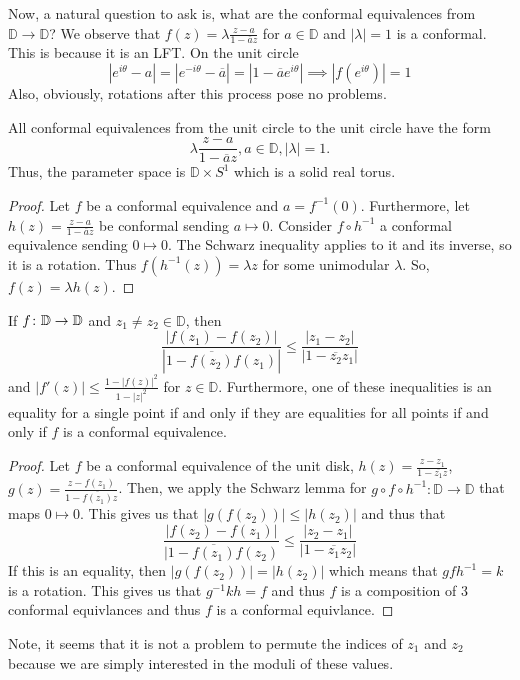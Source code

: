 \documentclass[11pt,leqno,oneside]{amsart}
\numberwithin{thm}{section}
\newcommand{\D}{\mathbb{D}}
\begin{document}
  Now, a natural question to ask is, what are the conformal
  equivalences from $\D \to \D$? We observe that $f(z) =
  \lambda\frac{z-a}{1-\overline{a}z}$ for $a \in \D$ and $|\lambda| =
  1$ is a conformal. This is because it is an LFT. On the unit
  circle \[
    |e^{i \theta} - a| = |e^{-i\theta} - \overline{a}| = |1 -
    \overline{a}e^{i\theta}| \implies |f(e^{i\theta})| = 1
  \]
  Also, obviously, rotations after this process pose no problems.
  \begin{thm}
    All conformal equivalences from the unit circle to the unit circle
    have the form \[
      \lambda \frac{z-a}{1-\overline{a}z}, a \in \D, |\lambda| = 1.
    \]
    Thus, the parameter space is $\D \times S^1$ which is a solid real torus.
  \end{thm}
  \begin{proof}
    Let $f$ be a conformal equivalence and $a =
    f^{-1}(0)$. Furthermore, let $h(z) = \frac{z-a}{1-\overline{a}z}$
    be conformal sending $a \mapsto 0$. Consider $f \circ h^{-1}$ a
    conformal equivalence sending $0 \mapsto 0$. The Schwarz
    inequality applies to it and its inverse, so it is a
    rotation. Thus $f(h^{-1}(z)) = \lambda z$ for some unimodular
    $\lambda$. So, $f(z) = \lambda h(z)$.
  \end{proof}
  \begin{lem}
    If $f\from \D \to \D$ and $z_1 \neq z_2 \in \D$, then \[
      \frac{|f(z_1)-f(z_2)|}{|1-\overline{f(z_2)}f(z_1)|} \leq \frac{|z_1-z_2|}{|1-\overline{z_2}z_1|}
    \]
    and $|f'(z)| \leq \frac{1-|f(z)|^2}{1-|z|^2}$ for $z \in
    \D$. Furthermore, one of these inequalities is an equality for
    a single point if and only if they are equalities for all points
    if and only if $f$ is a conformal equivalence.
  \end{lem}
  \begin{proof}
    Let $f$ be a conformal equivalence of the unit disk, $h(z) =
    \frac{z-z_1}{1-\overline{z_1}z}$, $g(z) =
    \frac{z-f(z_1)}{1-\overline{f(z_1)}z}$. Then, we apply the Schwarz
    lemma for $g\circ f \circ h^{-1}: \D \to \D$ that maps $0 \mapsto
    0$. This gives us that $|g(f(z_2))| \leq |h(z_2)|$ and thus that \[
      \frac{|f(z_2)-f(z_1)|}{|1-\overline{f(z_1)}f(z_2)} \leq \frac{|z_2-z_1|}{|1-\overline{z_1}z_2|}
   \]
   If this is an equality, then $|g(f(z_2))| = |h(z_2)|$ which means
   that $gfh^{-1} = k$ is a rotation. This gives us that $g^{-1}kh =
   f$ and thus $f$ is a composition of 3 conformal equivlances and
   thus $f$ is a conformal equivlance.
 \end{proof}
 Note, it seems that it is not a problem to permute the indices of
 $z_1$ and $z_2$ because we are simply interested in the moduli of
 these values.
\end{document}
